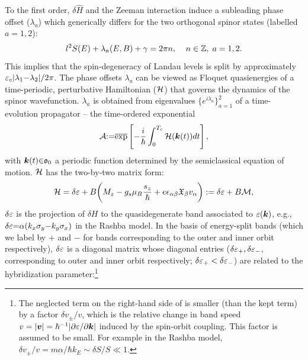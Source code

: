 \documentclass[aps, prb, showpacs, twocolumn, notitlepage, superscriptaddress]{revtex4-1}
\begin{document}

To the first order, $\delta \hat{H}$ and the Zeeman interaction induce a subleading phase offset ($\lambda_a$) which generically differs for the two orthogonal spinor states (labelled $a{=}1,2$):
\begin{equation}
l^2S(E)+\lambda_a(E,B)+\gamma=2\pi n,\;\;\;\;  n\in \mathbb{Z},\;a=1,2. \label{eq:rule}
\end{equation}
This implies that the spin-degeneracy of Landau levels is split   by approximately  $\varepsilon_c|\lambda_1{-}\lambda_2|/2\pi$. The phase offsets $\lambda_a$ can be viewed as Floquet quasienergies of a time-periodic, perturbative Hamiltonian (${\cal H}$) that governs the dynamics of the spinor wavefunction.  $\lambda_a$ is obtained  from  eigenvalues $\{e^{i\lambda_a}\}_{a=1}^2$ of a time-evolution propagator -- the time-ordered exponential 
\begin{equation}
{\cal A}{:}{=}\overline{\exp}\left[-\frac{i}{\hbar}\int_0^{T_c} {\cal H}(\boldsymbol{k}(t)) dt\right],
\label{eq:prop}
\end{equation} 
with $\boldsymbol{k}(t){\in}\mathfrak{o}_0$ a periodic function determined by the semiclassical equation of motion.   ${\cal H}$ has the two-by-two matrix form:
\begin{equation}
  {\cal H}=\delta \varepsilon +B\bigg(M_z -g_s\mu_{B}\frac{s_z}{\hbar} + e\epsilon_{\alpha\beta}\mathfrak{X}_{\beta}v_{\alpha}\bigg):=\delta \varepsilon+B{\cal M},\label{eq:H1}
\end{equation}
$\delta \varepsilon$ is the projection of $\delta H$ to the quasidegenerate band associated to $\varepsilon(\boldsymbol{k})$, e.g., $\delta \varepsilon{=}\alpha(k_x\sigma_y{-}k_y\sigma_x)$ in the Rashba model. In the basis of energy-split bands (which we label by ${+}$ and $-$ for bands corresponding to the outer and inner orbit respectively), $\delta \varepsilon$ is a diagonal matrix whose diagonal entries ($\delta \varepsilon_+,\delta \varepsilon_-$, corresponding to outer and inner orbit respectively; $\delta \varepsilon_+<\delta \varepsilon_-$) are related to the hybridization parameter:\footnote{The neglected term on the right-hand side of   is smaller (than the kept term) by a factor $\delta v_{\pm}/v$, which is the relative change in band speed $v=|\boldsymbol{v}|=\hbar^{-1}|\partial \varepsilon/\partial \boldsymbol{k}|$ induced by the spin-orbit coupling. This factor is assumed to be small.  For example in the Rashba model, $\delta v_{\pm}/v=m\alpha/\hbar k_E{\sim}\delta S/S{\ll}1$.}   
\end{document}
